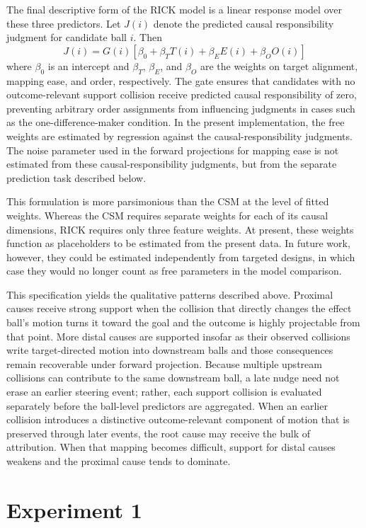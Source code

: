 \documentclass[10pt,letterpaper]{article}
\begin{document}
The final descriptive form of the RICK model is a linear response model over these three predictors. Let $J(i)$ denote the predicted causal responsibility judgment for candidate ball $i$. Then
\[
J(i) = G(i)\left[\beta_0 + \beta_T T(i) + \beta_E E(i) + \beta_O O(i)\right]
\]
where $\beta_0$ is an intercept and $\beta_T$, $\beta_E$, and $\beta_O$ are the weights on target alignment, mapping ease, and order, respectively. The gate ensures that candidates with no outcome-relevant support collision receive predicted causal responsibility of zero, preventing arbitrary order assignments from influencing judgments in cases such as the one-difference-maker condition. In the present implementation, the free weights are estimated by regression against the causal-responsibility judgments. The noise parameter used in the forward projections for mapping ease is not estimated from these causal-responsibility judgments, but from the separate prediction task described below.

This formulation is more parsimonious than the CSM at the level of fitted weights. Whereas the CSM requires separate weights for each of its causal dimensions, RICK requires only three feature weights. At present, these weights function as placeholders to be estimated from the present data. In future work, however, they could be estimated independently from targeted designs, in which case they would no longer count as free parameters in the model comparison.

This specification yields the qualitative patterns described above. Proximal causes receive strong support when the collision that directly changes the effect ball's motion turns it toward the goal and the outcome is highly projectable from that point. More distal causes are supported insofar as their observed collisions write target-directed motion into downstream balls and those consequences remain recoverable under forward projection. Because multiple upstream collisions can contribute to the same downstream ball, a late nudge need not erase an earlier steering event; rather, each support collision is evaluated separately before the ball-level predictors are aggregated. When an earlier collision introduces a distinctive outcome-relevant component of motion that is preserved through later events, the root cause may receive the bulk of attribution. When that mapping becomes difficult, support for distal causes weakens and the proximal cause tends to dominate.

\section{Experiment 1}
\end{document}
